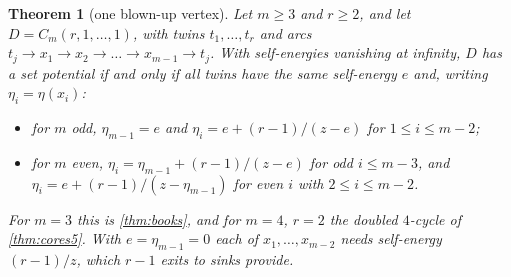 \documentclass[11pt]{amsart}
\theoremstyle{plain}
\newtheorem{theorem}{Theorem}[section]
\theoremstyle{definition}
\theoremstyle{remark}
\numberwithin{equation}{section}
\begin{document}
\begin{theorem}[one blown-up vertex]\label{thm:one-blown}
Let $m\ge3$ and $r\ge2$, and let $D=C_m(r,1,\dots,1)$, with twins $t_1,\dots,t_r$ and arcs $t_j\to x_1\to x_2\to\dots\to x_{m-1}\to t_j$. With self-energies vanishing at infinity, $D$ has a set potential if and only if all twins have the same self-energy $e$ and, writing $\eta_i=\eta(x_i)$:
\begin{itemize}
\item for $m$ odd, $\eta_{m-1}=e$ and $\eta_i=e+(r-1)/(z-e)$ for $1\le i\le m-2$;
\item for $m$ even, $\eta_i=\eta_{m-1}+(r-1)/(z-e)$ for odd $i\le m-3$, and $\eta_i=e+(r-1)/(z-\eta_{m-1})$ for even $i$ with $2\le i\le m-2$.
\end{itemize}
For $m=3$ this is \cref{thm:books}, and for $m=4$, $r=2$ the doubled $4$-cycle of \cref{thm:cores5}. With $e=\eta_{m-1}=0$ each of $x_1,\dots,x_{m-2}$ needs self-energy $(r-1)/z$, which $r-1$ exits to sinks provide.
\end{theorem}
\end{document}
